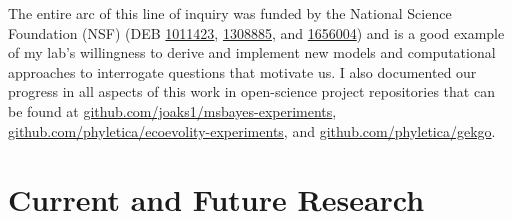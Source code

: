 The entire arc of this line of inquiry was funded by the National Science
Foundation (NSF)
(DEB
\href{https://www.nsf.gov/awardsearch/showAward?AWD_ID=1011423}{1011423},
\href{https://www.nsf.gov/awardsearch/showAward?AWD_ID=1308885}{1308885},
and
\href{https://www.nsf.gov/awardsearch/showAward?AWD_ID=1656004}{1656004})
and is a good example of my lab's willingness to derive and implement new
models and computational approaches to interrogate questions that motivate us.
I also documented our progress in all aspects of this work in open-science
project repositories that can be found at
\href{https://github.com/joaks1/msbayes-experiments}{github.com/joaks1/msbayes-experiments},
\href{https://github.com/phyletica/ecoevolity-experiments}{github.com/phyletica/ecoevolity-experiments},
and
\href{https://github.com/phyletica/gekgo}{github.com/phyletica/gekgo}.







\section*{Current and Future Research}


